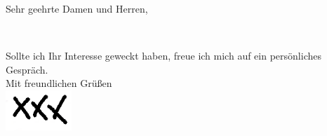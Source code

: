 \documentclass[
    foldmarks=false,
    foldmarks=TBMPL,
    firsthead=on,
    locfield=wide,
    version=last,
    pagenumber=off,
    enlargefirstpage=on,
    backaddress=false
]{scrlttr2}
\begin{document}
    \begin{letter}{
        \vcompanyname\\
        \vcompanystreet\\
        \vcompanyzip\ \vcompanycity
    }

    \opening{Sehr geehrte Damen und Herren,}

    \lipsum[1-2]\

      Sollte ich Ihr Interesse geweckt haben, freue ich mich auf ein
      persönliches Gespräch.\\

    Mit freundlichen Grüßen\\
    \includegraphics[width=2.5cm]{graphics/sign.png}\\
    \vname

    \end{letter}
\end{document}
